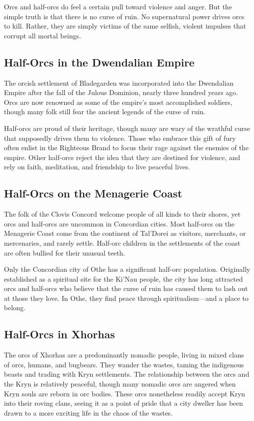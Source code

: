 \documentclass[10pt,a4paper,twoside,bg=print,twocolumn,openany,nodeprecatedcode]{dndbook}
\begin{document}
Orcs and half-orcs do feel a certain pull toward violence and anger. But the simple truth is that there is no curse of ruin. No supernatural power drives orcs to kill. Rather, they are simply victims of the same selfish, violent impulses that corrupt all mortal beings.

\subsection{Half-Orcs in the Dwendalian Empire}
The orcish settlement of Bladegarden was incorporated into the Dwendalian Empire after the fall of the Julous Dominion, nearly three hundred years ago. Orcs are now renowned as some of the empire's most accomplished soldiers, though many folk still fear the ancient legends of the curse of ruin.

Half-orcs are proud of their heritage, though many are wary of the wrathful curse that supposedly drives them to violence. Those who embrace this gift of fury often enlist in the Righteous Brand to focus their rage against the enemies of the empire. Other half-orcs reject the idea that they are destined for violence, and rely on faith, meditation, and friendship to live peaceful lives.

\subsection{Half-Orcs on the Menagerie Coast}
The folk of the Clovis Concord welcome people of all kinds to their shores, yet orcs and half-orcs are uncommon in Concordian cities. Most half-orcs on the Menagerie Coast come from the continent of Tal'Dorei as visitors, merchants, or mercenaries, and rarely settle. Half-orc children in the settlements of the coast are often bullied for their unusual teeth.

Only the Concordian city of Othe has a significant half-orc population. Originally established as a spiritual site for the Ki'Nau people, the city has long attracted orcs and half-orcs who believe that the curse of ruin has caused them to lash out at those they love. In Othe, they find peace through spiritualism—and a place to belong.

\subsection{Half-Orcs in Xhorhas}
The orcs of Xhorhas are a predominantly nomadic people, living in mixed clans of orcs, humans, and bugbears. They wander the wastes, taming the indigenous beasts and trading with Kryn settlements. The relationship between the orcs and the Kryn is relatively peaceful, though many nomadic orcs are angered when Kryn souls are reborn in orc bodies. These orcs nonetheless readily accept Kryn into their roving clans, seeing it as a point of pride that a city dweller has been drawn to a more exciting life in the chaos of the wastes.
\end{document}
